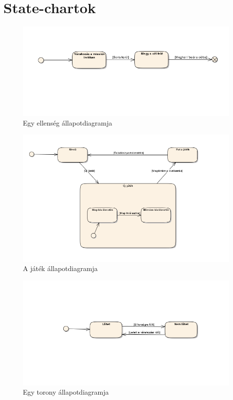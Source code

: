 \pagebreak
\section{State-chartok}

\begin{figure}[H]
\begin{center}
\includegraphics[width=15cm]{images/ch04/enemy_state.png}
\caption{Egy ellenség állapotdiagramja}
\label{fig:enemy_state}
\end{center}
\end{figure}

\begin{figure}[H]
\begin{center}
\includegraphics[width=15cm]{images/ch04/game_state.png}
\caption{A játék állapotdiagramja}
\label{fig:game_state}
\end{center}
\end{figure}

\begin{figure}[H]
\begin{center}
\includegraphics[width=15cm]{images/ch04/tower_state.png}
\caption{Egy torony állapotdiagramja}
\label{fig:tower_state}
\end{center}
\end{figure}

